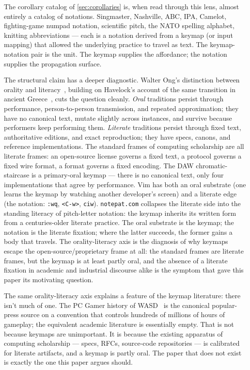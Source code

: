 \documentclass[10pt,letterpaper,twocolumn]{article}
\begin{document}
The corollary catalog of \textsection\ref{sec:corollaries} is, when read through this lens, almost entirely a catalog of notations. Singmaster, Nashville, ABC, IPA, Camelot, fighting-game numpad notation, scientific pitch, the NATO spelling alphabet, knitting abbreviations --- each is a notation derived from a keymap (or input mapping) that allowed the underlying practice to travel as text. The keymap-notation pair is the unit. The keymap supplies the affordance; the notation supplies the propagation surface.

The structural claim has a deeper diagnostic. Walter Ong's distinction between orality and literacy~\citep{ong1982orality}, building on Havelock's account of the same transition in ancient Greece~\citep{havelock1963preface}, cuts the question cleanly. \emph{Oral} traditions persist through performance, person-to-person transmission, and repeated approximation; they have no canonical text, mutate slightly across instances, and survive because performers keep performing them. \emph{Literate} traditions persist through fixed text, authoritative editions, and exact reproduction; they have specs, canons, and reference implementations. The standard frames of computing scholarship are all literate frames: an open-source license governs a fixed text, a protocol governs a fixed wire format, a format governs a fixed encoding. The DAW chromatic-staircase is a primary-oral keymap --- there is no canonical text, only four implementations that agree by performance. Vim has both an oral substrate (one learns the keymap by watching another developer's screen) and a literate edge (the notation: \texttt{:wq}, \texttt{<C-w>}, \texttt{ciw}). \texttt{notepat.com} collapses the literate side into the standing literacy of pitch-letter notation: the keymap inherits its written form from a centuries-older literate practice. The oral substrate is the keymap; the notation is the literate fixation; where the latter succeeds, the former gains a body that travels. The orality-literacy axis is the diagnosis of why keymaps escape the open-source/proprietary frame at all: the standard frames are literate frames, but the keymap is at least partly oral, and the absence of a literate fixation in academic and industrial discourse alike is the symptom that gave this paper its motivating question.

The same orality-literacy axis explains a feature of the keymap literature: there isn't much of one. The PC Gamer history of WASD~\citep{fenlon2016wasd} is the canonical popular-press source on a convention that controls hundreds of millions of hours of gameplay; the equivalent academic literature is essentially empty. That is not because keymaps are unimportant. It is because the existing apparatus of computing scholarship --- specs, RFCs, source-code repositories --- is calibrated for literate artifacts, and a keymap is partly oral. The paper that does not exist is exactly the one this paper argues should.
\end{document}
